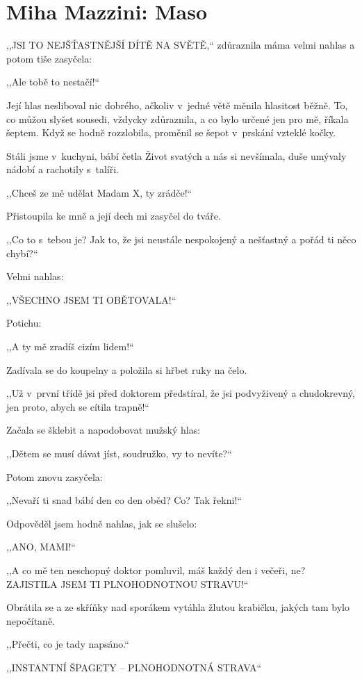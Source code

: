 \section{Miha Mazzini: Maso}

\noindent
,,JSI TO NEJŠŤASTNĚJŠÍ DÍTĚ NA SVĚTĚ,`` zdůraznila máma velmi nahlas a potom tiše zasyčela:

,,Ale tobě to nestačí!``

Její hlas nesliboval nic dobrého, ačkoliv v~jedné větě měnila hlasitost běžně. To, co můžou slyšet sousedi, vždycky zdůraznila, a co bylo určené jen pro mě, říkala šeptem. Když se hodně rozzlobila, proměnil se šepot v prskání vzteklé kočky. 

Stáli jsme v kuchyni, bábí četla Život svatých a nás si nevšímala, duše umývaly nádobí a rachotily s talíři. 

,,Chceš ze mě udělat Madam X, ty zrádče!``

Přistoupila ke mně a její dech mi zasyčel do tváře. 

,,Co to s tebou je? Jak to, že jsi neustále nespokojený a nešťastný a pořád ti něco chybí?``

Velmi nahlas:

,,VŠECHNO JSEM TI OBĚTOVALA!``

Potichu:

,,A ty mě zradíš cizím lidem!``

Zadívala se do koupelny a položila si hřbet ruky na čelo.

,,Už v~první třídě jsi před doktorem předstíral, že jsi podvyživený a chudokrevný, jen proto, abych se cítila trapně!``

Začala se šklebit a napodobovat mužský hlas:

,,Dětem se musí dávat jíst, soudružko, vy to nevíte?``

Potom znovu zasyčela:

,,Nevaří ti snad bábí den co den oběd? Co? Tak řekni!``

Odpověděl jsem hodně nahlas, jak se slušelo:

,,ANO, MAMI!``

,,A co mě ten neschopný doktor pomluvil, máš každý den i večeři, ne? ZAJISTILA JSEM TI PLNOHODNOTNOU STRAVU!``

Obrátila se a ze skříňky nad sporákem vytáhla žlutou krabičku, jakých tam bylo nepočítaně.

,,Přečti, co je tady napsáno.``

,,INSTANTNÍ ŠPAGETY -- PLNOHODNOTNÁ STRAVA``


